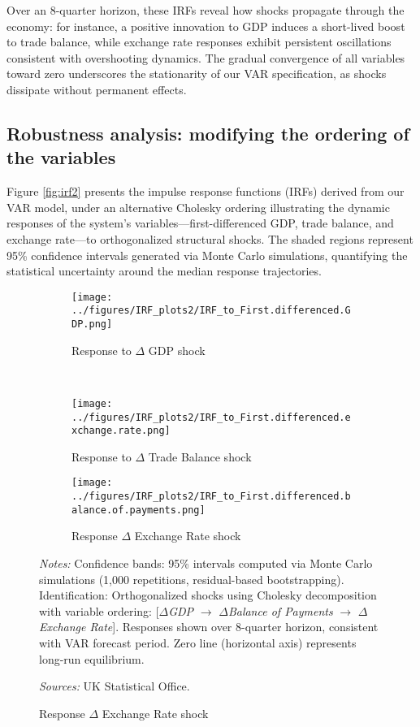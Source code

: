 \documentclass[
]{article}
\begin{document}
	Over an 8-quarter horizon, these IRFs reveal how shocks propagate
	through the economy: for instance, a positive innovation to GDP induces a 
	short-lived boost to trade balance, while exchange rate responses exhibit 
	persistent oscillations consistent with overshooting dynamics. The gradual 
	convergence of all variables toward zero underscores the stationarity of our 
	VAR specification, as shocks dissipate without permanent effects.
	
	\subsection{Robustness analysis: modifying the ordering of the variables}
	
	Figure \ref{fig:irf2} presents the impulse response functions (IRFs) derived from our VAR model, 
	under an alternative Cholesky ordering
	illustrating the dynamic responses of the system’s variables—first-differenced GDP, 
	trade balance, and exchange rate—to orthogonalized structural shocks. The 
	shaded regions represent 95\% confidence intervals generated via Monte Carlo 
	simulations, quantifying the statistical uncertainty around the median response
	trajectories. 
	
	\begin{figure}[!htbp]
		\centering
		\caption{\textsc{Impulse Response Functions}}
		\label{fig:irf2}
		
		\begin{subfigure}[b]{0.32\textwidth}
			\centering
			\texttt{[image: ../figures/IRF\_plots2/IRF\_to\_First.differenced.GDP.png]}
			\caption{Response to $\Delta$ GDP shock}
			\label{fig:irf_gdp2}
		\end{subfigure}
		\\
		\begin{subfigure}[b]{0.32\textwidth}
			\centering
			\texttt{[image: ../figures/IRF\_plots2/IRF\_to\_First.differenced.exchange.rate.png]}
			\caption{Response to $\Delta$ Trade Balance shock}
			\label{fig:irf_tb2}
		\end{subfigure}
		\begin{subfigure}[b]{0.32\textwidth}
			\centering
			\texttt{[image: ../figures/IRF\_plots2/IRF\_to\_First.differenced.balance.of.payments.png]}
			\caption{Response $\Delta$ Exchange Rate shock}
			\label{fig:irf_fx2}
		\end{subfigure}
		
		\begin{minipage}{\textwidth}
			\footnotesize
			\textit{Notes:} Confidence bands: 95\% intervals computed via Monte Carlo simulations (1,000 repetitions, residual-based bootstrapping).
			Identification: Orthogonalized shocks using Cholesky decomposition with variable ordering: 
			[$\Delta$\textit{GDP} $\rightarrow$ $\Delta$\textit{Balance of Payments} $\rightarrow$ $\Delta$\textit{Exchange Rate}].
			Responses shown over 8-quarter horizon, 
			consistent with VAR forecast period.
			Zero line (horizontal axis) represents long-run equilibrium.
			
			
			\textit{Sources:} UK Statistical Office.
		\end{minipage}
	\end{figure}
	
\end{document}
